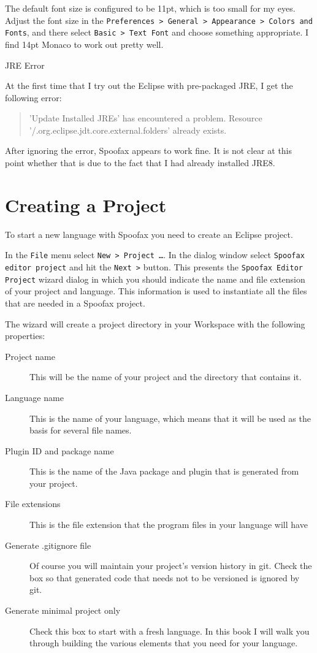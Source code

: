 The default font size is configured to be 11pt, which is too small for my eyes. 
Adjust the font size in the \texttt{Preferences > General > Appearance > Colors
and Fonts}, and there select \texttt{Basic > Text Font} and choose something
appropriate. I find 14pt Monaco to work out pretty well.

\begin{sidenote}{JRE Error}

At the first time that I try out the Eclipse with
pre-packaged JRE, I get the following error: 

\begin{quote}
'Update Installed JREs' has encountered a problem.
Resource '/.org.eclipse.jdt.core.external.folders' already exists.
\end{quote} 

\noindent
After ignoring the error, Spoofax appears to work fine. It is not clear at this
point whether that is due to the fact that I had already installed JRE8.

\end{sidenote} 

\section{Creating a Project}

To start a new language with Spoofax you need to create an Eclipse project.

In the \texttt{File} menu select \texttt{New > Project \ldots}. In the dialog
window select \texttt{Spoofax editor project} and hit the \texttt{Next >}
button. This presents the \texttt{Spoofax Editor Project} wizard dialog in
which you should indicate the name and file extension of your project
and language. This information is used to instantiate all the files that are
needed in a Spoofax project.

The wizard will create a project directory in your Workspace with the following
properties:

\begin{description}
\item[Project name] This will be the name of your project and the directory that
contains it.
\item[Language name] This is the name of your language, which means that it will
be used as the basis for several file names.
\item[Plugin ID and package name] This is the name of the Java
package and plugin that is generated from your project.
\item[File extensions] This is the file extension that the program files in
your language will have 
\item[Generate .gitignore file] Of course you will maintain your project's
version history in git. Check the box so that generated code that needs not to
be versioned is ignored by git.
\item[Generate minimal project only] Check this box to start with a fresh
language. In this book I will walk you through building the various elements
that you need for your language.
\end{description}

